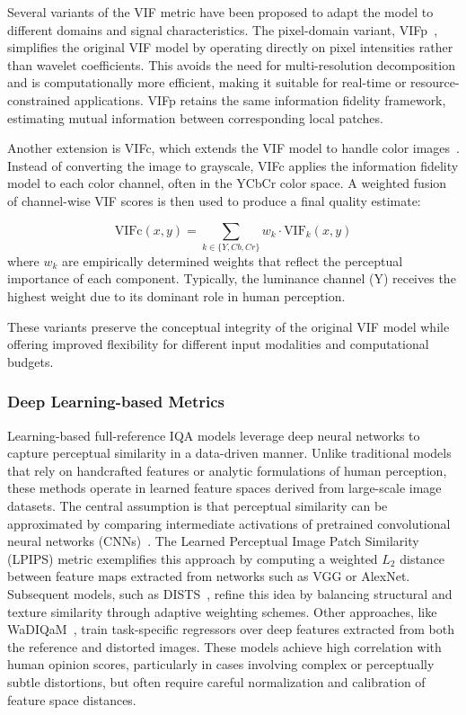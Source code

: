 Several variants of the VIF metric have been proposed to adapt the model to different domains and signal characteristics. The pixel-domain variant, VIFp~\cite{Sheikh2005VIFp}, simplifies the original VIF model by operating directly on pixel intensities rather than wavelet coefficients. This avoids the need for multi-resolution decomposition and is computationally more efficient, making it suitable for real-time or resource-constrained applications. VIFp retains the same information fidelity framework, estimating mutual information between corresponding local patches.

Another extension is VIFc, which extends the VIF model to handle color images~\cite{Sheikh2006VIF}. Instead of converting the image to grayscale, VIFc applies the information fidelity model to each color channel, often in the YCbCr color space. A weighted fusion of channel-wise VIF scores is then used to produce a final quality estimate:

\begin{equation}
\text{VIFc}(x, y) = \sum_{k \in \{Y,Cb,Cr\}} w_k \cdot \text{VIF}_k(x, y)
\end{equation}
where $w_k$ are empirically determined weights that reflect the perceptual importance of each component. Typically, the luminance channel (Y) receives the highest weight due to its dominant role in human perception.

These variants preserve the conceptual integrity of the original VIF model while offering improved flexibility for different input modalities and computational budgets.

\subsubsection{Deep Learning-based Metrics}\label{sec:deep_learning_based_metrics}

Learning-based full-reference IQA models leverage deep neural networks to capture perceptual similarity in a data-driven manner. Unlike traditional models that rely on handcrafted features or analytic formulations of human perception, these methods operate in learned feature spaces derived from large-scale image datasets. The central assumption is that perceptual similarity can be approximated by comparing intermediate activations of pretrained convolutional neural networks (CNNs)~\cite{Zhang2018LPIPS}. The Learned Perceptual Image Patch Similarity (LPIPS) metric exemplifies this approach by computing a weighted $L_2$ distance between feature maps extracted from networks such as VGG or AlexNet. Subsequent models, such as DISTS~\cite{ding2020dists}, refine this idea by balancing structural and texture similarity through adaptive weighting schemes. Other approaches, like WaDIQaM~\cite{Bosse2018WaDIQaM}, train task-specific regressors over deep features extracted from both the reference and distorted images. These models achieve high correlation with human opinion scores, particularly in cases involving complex or perceptually subtle distortions, but often require careful normalization and calibration of feature space distances.

